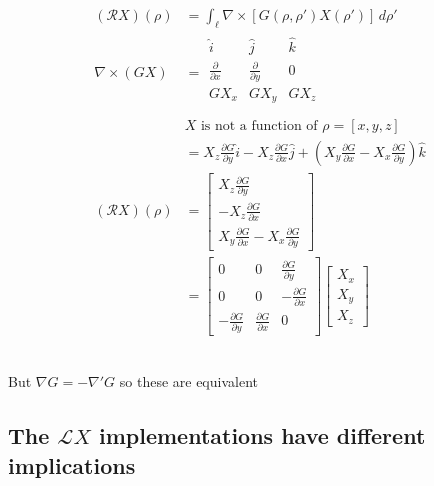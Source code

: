 \documentclass{article}
\newcommand{\X}{\mathbf{X}}
\newcommand{\0}{\varnothing}
\begin{document}
\begin{minipage}{0.45\textwidth}
\begin{align*}
     (\mathcal{R}X)(\rho) &= \int_{\ell}\nabla \times [G(\rho,\rho')X(\rho')] \,d\rho'\\
      \nabla \times  (G X) &= 
    \begin{array}{|ccc|}
    \hat i & \hat j & \hat k\\
    \frac{\partial }{\partial x} & \frac{\partial }{\partial y} & 0 \\
    G X_x & G X_y & G X_z \\
    \end{array} \\ &\text{$X$ is not a function of $\rho = [x,y,z]$}
    \\
    &=  X_z \frac{\partial G}{\partial y} \hat i - X_z \frac{\partial G}{\partial x} \hat j + \left(X_y \frac{\partial G}{\partial x} - X_x \frac{\partial G}{\partial y}\right) \hat k\\
    (\mathcal{R}X)(\rho) &= 
      \left[ \begin{array}{c} X_z \frac{\partial G}{\partial y} \\ - X_z \frac{\partial G}{\partial x} \\X_y \frac{\partial G}{\partial x} - X_x \frac{\partial G}{\partial y}   \end{array} \right] \\
       &= \left[ \begin{array}{ccc} 0 & 0 & \frac{\partial G}{\partial y}\\ 
                            0 & 0 &-\frac{\partial G}{\partial x}\\ 
                            -\frac{\partial G}{\partial y} &\frac{\partial G}{\partial x} &0 \end{array} \right]
        \left[ \begin{array}{c} 
        X_x \\ X_y \\ X_z \end{array} \right]
\end{align*}
\end{minipage}\\

{\centering But $\nabla G = - \nabla' G$ so these are equivalent\ \\}

\subsection{The $\mathcal{L}X$ implementations have different implications}
\end{document}
